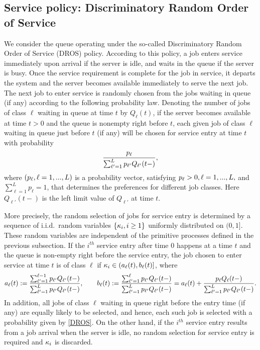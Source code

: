 \documentclass{article}
\begin{document}
\subsection{Service policy: Discriminatory Random Order of Service}
We consider the queue operating under the so-called Discriminatory Random Order of Service (DROS) policy. According to this policy, a job  enters service immediately upon arrival if the server is idle, and waits in the queue if the server is busy. Once the service requirement is complete for the job in service, it departs the system and the server becomes available immediately to serve the next job. The next job to enter service is randomly chosen from the jobs waiting in queue (if any) according to the following probability law. Denoting the number of jobs of class $\ell$ waiting in queue at time $t$ by $Q_\ell(t)$, if the server becomes available at time $t>0$ and the queue is nonempty right before $t$, each given job of class $\ell$ waiting in queue just before $t$ (if any) will be chosen for service entry at time $t$ with probability
\begin{equation}\label{DROS}
\frac{p_\ell}{\sum_{\ell'=1}^Lp_{\ell'}Q_{\ell'}(t-)},
\end{equation}
where $(p_\ell,\ell=1,...,L)$ is a probability vector, satisfying $p_\ell>0,\ell=1,...,L,$ and $\sum_{\ell=1}^Lp_{\ell}=1$, that determines the preferences for different job classes.
Here $Q_{\ell'}(t-)$ is the left limit value of $Q_{\ell'}$ at time $t$.

More precisely, the random selection of jobs for service entry is determined by a sequence of i.i.d.\ random variables $\{\kappa_i,i\geq1\}$ uniformly distributed on $(0,1]$.  These random variables are independent of the primitive processes defined in the previous subsection. If the $i^{th}$ service entry after time $0$ happens at a time $t$ and the queue is non-empty right before the service entry, the job chosen to enter service at time $t$ is of class $\ell$ if
$\kappa_i\in(a_\ell(t),b_\ell(t)]$, where
\begin{equation}\label{def_class_interval}
	a_\ell (t) := \frac{\sum_{\ell'=1}^{\ell-1}p_{\ell'}Q_{\ell'}(t-)}{\sum_{\ell'=1}^{L}p_{\ell'}Q_{\ell'}(t-)},\quad\quad 	b_\ell (t):= \frac{\sum_{\ell'=1}^{\ell}p_{\ell'}Q_{\ell'}(t-)}{\sum_{\ell'=1}^{L}p_{\ell'}Q_{\ell'}(t-)}= 	a_\ell (t)+ \frac{p_{\ell}Q_{\ell}(t-)}{\sum_{\ell'=1}^{L}p_{\ell'}Q_{\ell'}(t-)}.
\end{equation}
In addition, all jobs of class $\ell$ waiting in queue right before the entry time  (if any) are equally likely to be selected, and hence, each such job is selected with a probability given by \eqref{DROS}.  On the other hand, if the $i^{th}$ service entry results from a job arrival when the server is idle, no random selection for service entry is required and $\kappa_i$ is discarded.
\end{document}
